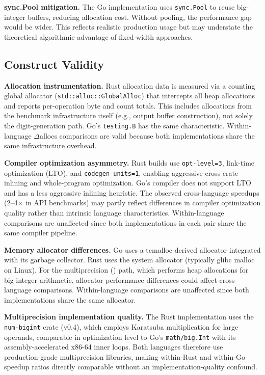 \textbf{sync.Pool mitigation.}
The Go \burgerdybvig implementation uses \texttt{sync.Pool} to reuse
big-integer buffers, reducing allocation cost.  Without pooling, the
performance gap would be wider.  This reflects realistic production usage
but may understate the theoretical algorithmic advantage of fixed-width
approaches.

\subsection{Construct Validity}

\textbf{Allocation instrumentation.}
Rust allocation data is measured via a counting global allocator
(\texttt{std::alloc::GlobalAlloc}) that intercepts all heap allocations
and reports per-operation byte and count totals.  This includes
allocations from the benchmark infrastructure itself (e.g., output buffer
construction), not solely the digit-generation path.  Go's
\texttt{testing.B} has the same characteristic.  Within-language
$\Delta$allocs comparisons are valid because both implementations share
the same infrastructure overhead.

\textbf{Compiler optimization asymmetry.}
Rust builds use \texttt{opt-level=3}, link-time optimization (LTO), and
\texttt{codegen-units=1}, enabling aggressive cross-crate inlining and
whole-program optimization.  Go's compiler does not support LTO and has
a less aggressive inlining heuristic.  The observed cross-language
speedups (2--4$\times$ in API benchmarks) may partly reflect differences
in compiler optimization quality rather than intrinsic language
characteristics.  Within-language comparisons are unaffected since both
implementations in each pair share the same compiler pipeline.

\textbf{Memory allocator differences.}
Go uses a tcmalloc-derived allocator integrated with its garbage
collector.  Rust uses the system allocator (typically glibc malloc on
Linux).  For the multiprecision (\burgerdybvig) path, which performs
heap allocations for big-integer arithmetic, allocator performance
differences could affect cross-language comparisons.  Within-language
comparisons are unaffected since both implementations share the same
allocator.

\textbf{Multiprecision implementation quality.}
The Rust \burgerdybvig implementation uses the \texttt{num-bigint}
crate (v0.4), which employs Karatsuba multiplication for large
operands, comparable in optimization level to Go's
\texttt{math/big.Int} with its assembly-accelerated x86-64 inner
loops.  Both languages therefore use production-grade multiprecision
libraries, making within-Rust and within-Go speedup ratios directly
comparable without an implementation-quality confound.

